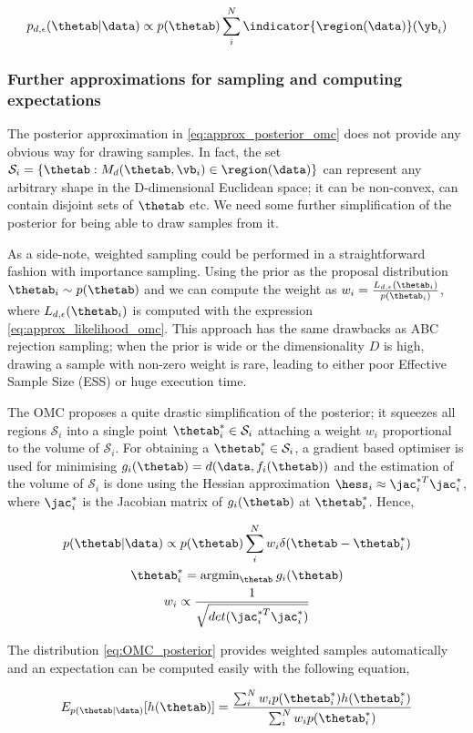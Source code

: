 \begin{equation} \label{eq:approx_posterior_omc}
  p_{d,\epsilon}(\thetab|\data)
  \propto p(\thetab) \sum_i^N \indicator{ \region(\data)} (\yb_i)
\end{equation}

\subsubsection*{Further approximations for sampling and computing expectations}

The posterior approximation in \eqref{eq:approx_posterior_omc} does not
provide any obvious way for drawing samples. In fact, the set
$\mathcal{S}_i = \{ \thetab: M_d(\thetab, \vb_i) \in \region(\data) \}$ can
represent any arbitrary shape in the D-dimensional Euclidean space; it
can be non-convex, can contain disjoint sets of $\thetab$ etc. We need
some further simplification of the posterior for being able to draw
samples from it.

As a side-note, weighted sampling could be performed in a
straightforward fashion with importance sampling. Using the prior as
the proposal distribution $\thetab_i \sim p(\thetab)$ and we can
compute the weight as
$w_i = \frac{L_{d,\epsilon}(\thetab_i)}{p(\thetab_i)}$, where
$L_{d,\epsilon}(\thetab_i)$ is computed with the expression
\eqref{eq:approx_likelihood_omc}. This approach has the same drawbacks as
ABC rejection sampling; when the prior is wide or the dimensionality
$D$ is high, drawing a sample with non-zero weight is rare, leading to
either poor Effective Sample Size (ESS) or huge execution time.

The OMC proposes a quite drastic simplification of the posterior; it
squeezes all regions $\mathcal{S}_i$ into a single point
$\thetab_i^* \in \mathcal{S}_i$ attaching a weight $w_i$ proportional
to the volume of $\mathcal{S}_i$. For obtaining a
$\thetab_i^* \in \mathcal{S}_i$, a gradient based optimiser is used
for minimising $g_i(\thetab) = d(\data, f_i(\thetab))$ and the
estimation of the volume of $\mathcal{S}_i$ is done using the Hessian
approximation $\hess_i \approx \jac_i^{*T}\jac_i^*$, where $\jac_i^*$
is the Jacobian matrix of $g_i(\thetab)$ at $\thetab_i^*$. Hence,

\begin{gather} \label{eq:OMC_posterior}
    p(\thetab|\data) \propto p(\thetab) \sum_i^N w_i \delta(\thetab - \thetab_i^*)\\
  \thetab_i^* = \text{argmin}_{\thetab} \:g_i(\thetab) \\
  w_i \propto \frac{1}{\sqrt{det( \jac_i^{*T}\jac_i^*)}}
\end{gather}

The distribution \eqref{eq:OMC_posterior} provides weighted samples
automatically and an expectation can be computed easily with the
following equation,

\begin{equation}
  \label{eq:OMC_expectation}
  E_{p(\thetab|\data)}[h(\thetab)] = \frac{\sum_i^N w_i p(\thetab_i^*)h(\thetab_i^*)}{\sum_i^N w_i p(\thetab_i^*)}
\end{equation}
